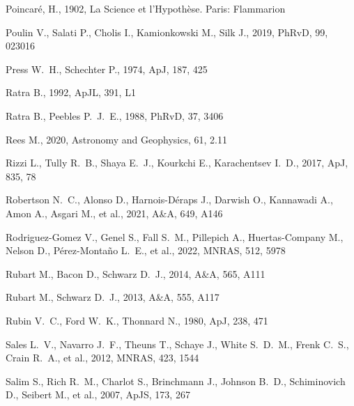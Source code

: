 \documentclass[fleqn,usenatbib]{mnras}
\begin{document}
\begin{thebibliography}{}
 Poincar\'e, H., 1902, La Science et l'Hypoth\`ese. Paris: Flammarion

 Poulin V., Salati P., Cholis I., Kamionkowski M., Silk J., 2019, PhRvD, 99, 023016

 Press W.~H., Schechter P., 1974, ApJ, 187, 425

 Ratra B., 1992, ApJL, 391, L1

 Ratra B., Peebles P.~J.~E., 1988, PhRvD, 37, 3406

 Rees M., 2020, Astronomy and Geophysics, 61, 2.11

 Rizzi L., Tully R.~B., Shaya E.~J., Kourkchi E., Karachentsev I.~D., 2017, ApJ, 835, 78

 Robertson N.~C., Alonso D., Harnois-D{\'e}raps J., Darwish O., Kannawadi A., Amon A., Asgari M., et al., 2021, A\&A, 649, A146

 Rodriguez-Gomez V., Genel S., Fall S.~M., Pillepich A., Huertas-Company M., Nelson D., P{\'e}rez-Monta{\~n}o L.~E., et al., 2022, MNRAS, 512, 5978

 Rubart M., Bacon D., Schwarz D.~J., 2014, A\&A, 565, A111

 Rubart M., Schwarz D.~J., 2013, A\&A, 555, A117

 Rubin V.~C., Ford W.~K., Thonnard N., 1980, ApJ, 238, 471

 Sales L.~V., Navarro J.~F., Theuns T., Schaye J., White S.~D.~M., Frenk C.~S., Crain R.~A., et al., 2012, MNRAS, 423, 1544

 Salim S., Rich R.~M., Charlot S., Brinchmann J., Johnson B.~D., Schiminovich D., Seibert M., et al., 2007, ApJS, 173, 267


\end{thebibliography}
\end{document}
